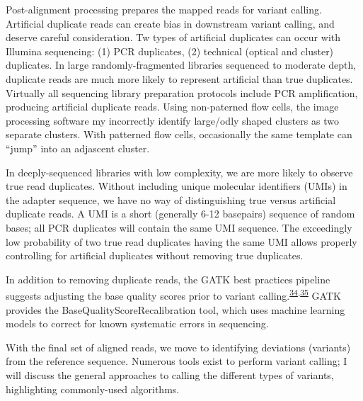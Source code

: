 \documentclass[11pt,letterpaper]{book}
\begin{document}
Post-alignment processing prepares the mapped reads for variant calling.
Artificial duplicate reads can create bias in downstream variant calling, and deserve careful consideration.
Tw types of artificial duplicates can occur with Illumina sequencing: (1) PCR duplicates, (2) technical (optical and cluster) duplicates.
In large randomly-fragmented libraries sequenced to moderate depth, duplicate reads are much more likely to represent artificial than true duplicates.
Virtually all sequencing library preparation protocols include PCR amplification, producing artificial duplicate reads.
Using non-paterned flow cells, the image processing software my incorrectly identify large/odly shaped clusters as two separate clusters.
With patterned flow cells, occasionally the same template can ``jump'' into an adjascent cluster.

In deeply-sequenced libraries with low complexity, we are more likely to observe true read duplicates.
Without including unique molecular identifiers (UMIs) in the adapter sequence, we have no way of distinguishing true versus artificial duplicate reads.
A UMI is a short (generally 6-12 basepairs) sequence of random bases; all PCR duplicates will contain the same UMI sequence.
The exceedingly low probability of two true read duplicates having the same UMI allows properly controlling for artificial duplicates without removing true duplicates.

In addition to removing duplicate reads, the GATK best practices pipeline suggests adjusting the base quality scores prior to variant calling.\textsuperscript{\protect\hyperlink{ref-mckenna:2010aa}{34},\protect\hyperlink{ref-depristo:2011aa}{35}}
GATK provides the BaseQualityScoreRecalibration tool, which uses machine learning models to correct for known systematic errors in sequencing.

With the final set of aligned reads, we move to identifying deviations (variants) from the reference sequence.
Numerous tools exist to perform variant calling; I will discuss the general approaches to calling the different types of variants, highlighting commonly-used algorithms.
\end{document}
